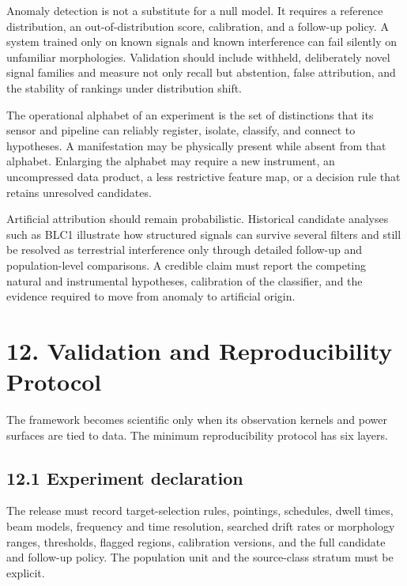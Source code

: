 \documentclass[11pt,a4paper]{article}
\begin{document}
Anomaly detection is not a substitute for a null model. It requires a reference distribution, an out-of-distribution score, calibration, and a follow-up policy. A system trained only on known signals and known interference can fail silently on unfamiliar morphologies. Validation should include withheld, deliberately novel signal families and measure not only recall but abstention, false attribution, and the stability of rankings under distribution shift.

The operational alphabet of an experiment is the set of distinctions that its sensor and pipeline can reliably register, isolate, classify, and connect to hypotheses. A manifestation may be physically present while absent from that alphabet. Enlarging the alphabet may require a new instrument, an uncompressed data product, a less restrictive feature map, or a decision rule that retains unresolved candidates.

Artificial attribution should remain probabilistic. Historical candidate analyses such as BLC1 illustrate how structured signals can survive several filters and still be resolved as terrestrial interference only through detailed follow-up and population-level comparisons. A credible claim must report the competing natural and instrumental hypotheses, calibration of the classifier, and the evidence required to move from anomaly to artificial origin.

\section{12. Validation and Reproducibility Protocol}\label{12-validation-and-reproducibility-protocol}

The framework becomes scientific only when its observation kernels and power surfaces are tied to data. The minimum reproducibility protocol has six layers.

\subsection{12.1 Experiment declaration}\label{121-experiment-declaration}

The release must record target-selection rules, pointings, schedules, dwell times, beam models, frequency and time resolution, searched drift rates or morphology ranges, thresholds, flagged regions, calibration versions, and the full candidate and follow-up policy. The population unit and the source-class stratum must be explicit.
\end{document}
